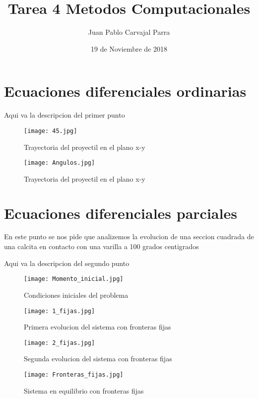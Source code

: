 \documentclass[12pt]{article}
\author{Juan Pablo Carvajal Parra}
\date{19 de Noviembre de 2018}
\title{Tarea 4 Metodos Computacionales}
\begin{document}
\section{Ecuaciones diferenciales ordinarias}

Aqui va la descripcion del primer punto

\begin{figure}[h!]
    \centering
    \texttt{[image: 45.jpg]}
    \caption{Trayectoria del proyectil en el plano x-y}
    \label{fig1}
\end{figure}

\begin{figure}[h!]
    \centering
    \texttt{[image: Angulos.jpg]}
    \caption{Trayectoria del proyectil en el plano x-y}
    \label{fig2}
\end{figure}
















\section{Ecuaciones diferenciales parciales}

En este punto se nos pide que analizemos la evolucion de una seccion cuadrada de una calcita en contacto con una varilla a 100 grados centigrados 


Aqui va la descripcion del segundo punto


\begin{figure}[h!]
    \centering
    \texttt{[image: Momento\_inicial.jpg]}
    \caption{Condiciones iniciales del problema}
    \label{fig3}
\end{figure}


\begin{figure}[h!]
    \centering
    \texttt{[image: 1\_fijas.jpg]}
    \caption{Primera evolucion del sistema con fronteras fijas}
    \label{fig4}
\end{figure}


\begin{figure}[h!]
    \centering
    \texttt{[image: 2\_fijas.jpg]}
    \caption{Segunda evolucion del sistema con fronteras fijas}
    \label{fig5}
\end{figure}


\begin{figure}[h!]
    \centering
    \texttt{[image: Fronteras\_fijas.jpg]}
    \caption{Sistema en equilibrio con fronteras fijas}
    \label{fig12}
\end{figure}
\end{document}
